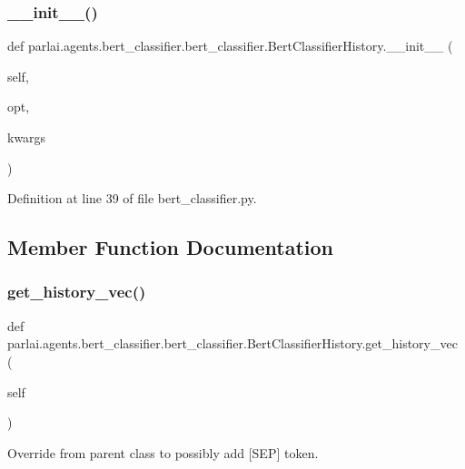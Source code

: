 \subsubsection{\texorpdfstring{\+\_\+\+\_\+init\+\_\+\+\_\+()}{\_\_init\_\_()}}
{\footnotesize\ttfamily def parlai.\+agents.\+bert\+\_\+classifier.\+bert\+\_\+classifier.\+Bert\+Classifier\+History.\+\_\+\+\_\+init\+\_\+\+\_\+ (\begin{DoxyParamCaption}\item[{}]{self,  }\item[{}]{opt,  }\item[{}]{kwargs }\end{DoxyParamCaption})}



Definition at line 39 of file bert\+\_\+classifier.\+py.



\subsection{Member Function Documentation}
\mbox{\label{classparlai_1_1agents_1_1bert__classifier_1_1bert__classifier_1_1BertClassifierHistory_ac5a9d856cbb3e3994e6c99dbb1578b13}} 
\subsubsection{\texorpdfstring{get\+\_\+history\+\_\+vec()}{get\_history\_vec()}}
{\footnotesize\ttfamily def parlai.\+agents.\+bert\+\_\+classifier.\+bert\+\_\+classifier.\+Bert\+Classifier\+History.\+get\+\_\+history\+\_\+vec (\begin{DoxyParamCaption}\item[{}]{self }\end{DoxyParamCaption})}

\begin{DoxyVerb}Override from parent class to possibly add [SEP] token.\end{DoxyVerb}
 

